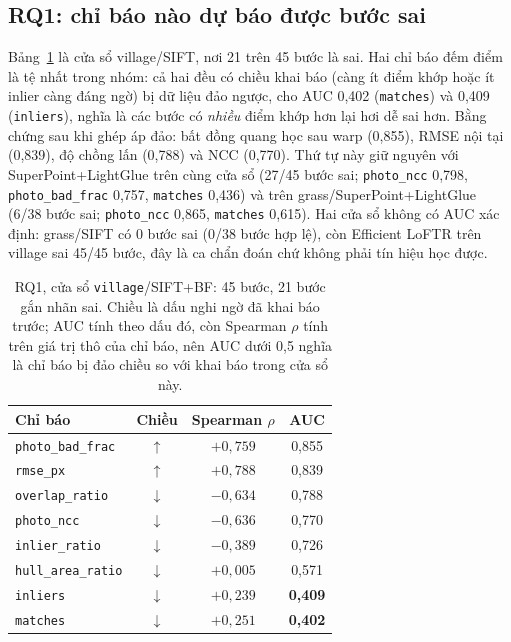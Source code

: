 \documentclass[conference]{IEEEtran}
\begin{document}
\subsection{RQ1: chỉ báo nào dự báo được bước sai}
Bảng~\ref{tab:rq1} là cửa sổ village/SIFT, nơi 21 trên 45 bước là sai. Hai chỉ
báo đếm điểm là tệ nhất trong nhóm: cả hai đều có chiều khai báo (càng ít điểm
khớp hoặc ít inlier càng đáng ngờ) bị dữ liệu đảo ngược, cho AUC 0,402
(\texttt{matches}) và 0,409
(\texttt{inliers}), nghĩa là các
bước có \emph{nhiều} điểm khớp hơn lại hơi dễ sai hơn. Bằng chứng sau khi ghép
áp đảo: bất đồng quang học sau warp (0,855), RMSE nội tại (0,839), độ chồng lấn
(0,788) và NCC (0,770). Thứ tự này giữ nguyên với SuperPoint+LightGlue trên
cùng cửa sổ (27/45 bước sai; \texttt{photo\_ncc} 0,798,
\texttt{photo\_bad\_frac} 0,757, \texttt{matches} 0,436) và trên
grass/SuperPoint+LightGlue (6/38 bước sai; \texttt{photo\_ncc} 0,865,
\texttt{matches} 0,615). Hai cửa sổ không có AUC xác định: grass/SIFT có 0 bước
sai (0/38 bước hợp lệ), còn Efficient LoFTR trên village sai 45/45 bước, đây
là ca chẩn đoán chứ không phải tín hiệu học được.

\begin{table}[t]
\caption{RQ1, cửa sổ \texttt{village}/SIFT+BF: 45 bước, 21 bước gắn nhãn sai.
Chiều là dấu nghi ngờ đã khai báo trước; AUC tính theo dấu đó, còn Spearman
$\rho$ tính trên giá trị thô của chỉ báo, nên AUC dưới 0,5 nghĩa là chỉ báo bị
đảo chiều so với khai báo trong cửa sổ này.}\label{tab:rq1}
\centering\footnotesize
\setlength{\tabcolsep}{4pt}
\begin{tabular}{lccc}
\toprule
Chỉ báo & Chiều & Spearman $\rho$ & AUC \\
\midrule
\texttt{photo\_bad\_frac} & $\uparrow$ & $+0{,}759$ & 0,855 \\
\texttt{rmse\_px}         & $\uparrow$ & $+0{,}788$ & 0,839 \\
\texttt{overlap\_ratio}   & $\downarrow$ & $-0{,}634$ & 0,788 \\
\texttt{photo\_ncc}       & $\downarrow$ & $-0{,}636$ & 0,770 \\
\texttt{inlier\_ratio}    & $\downarrow$ & $-0{,}389$ & 0,726 \\
\texttt{hull\_area\_ratio}& $\downarrow$ & $+0{,}005$ & 0,571 \\
\texttt{inliers}          & $\downarrow$ & $+0{,}239$ & \textbf{0,409} \\
\texttt{matches}          & $\downarrow$ & $+0{,}251$ & \textbf{0,402} \\
\bottomrule
\end{tabular}
\end{table}
\end{document}
